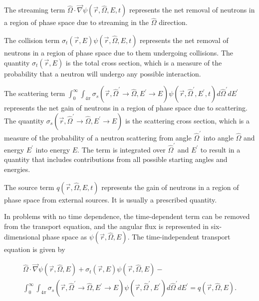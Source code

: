 The streaming term $\hat{\Omega}\cdot\vec{\nabla}\psi\left(\vec{r},\hat{\Omega},E,t\right)$
represents the net removal of neutrons in a region of phase space due to streaming in the $\hat{\Omega}$ direction.

The collision term $\sigma_t\left(\vec{r},E\right)\psi\left(\vec{r},\hat{\Omega},E,t\right)$
represents the net removal of neutrons in a region of phase space due to them undergoing collisions.
The quantity $\sigma_t\left(\vec{r},E\right)$ is the total cross section, which is a measure of the probability that a neutron will undergo any possible interaction.

The scattering term $\int_0^\infty\int_{4\pi}\sigma_s\left(\vec{r},\hat{\Omega}^\prime\rightarrow\hat{\Omega},E^\prime\rightarrow E\right)\psi\left(\vec{r},\hat{\Omega}^\prime,E^\prime,t\right)d\hat{\Omega}^\prime dE^\prime$
represents the net gain of neutrons in a region of phase space due to scattering.
The quantity $\sigma_s\left(\vec{r},\hat{\Omega}^\prime\rightarrow\hat{\Omega},E^\prime\rightarrow E\right)$ is the scattering cross section,
which is a measure of the probability of a neutron scattering from angle $\hat{\Omega}^\prime$ into angle ${\hat{\Omega}}$ and energy $E^\prime$ into energy $E$.
The term is integrated over $\hat{\Omega}^\prime$ and $E^\prime$ to result in a quantity that includes contributions from all possible starting angles and energies.

The source term $q\left(\vec{r},\hat{\Omega},E,t\right)$
represents the gain of neutrons in a region of phase space from external sources.
It is usually a prescribed quantity.

In problems with no time dependence, the time-dependent term can be removed from the transport equation,
and the angular flux is represented in six-dimensional phase space as $\psi\left(\vec{r},\hat{\Omega},E\right)$.
The time-independent transport equation is given by

\begin{multline}\label{eq:bg:rt:transport}
  \hat{\Omega}\cdot\vec{\nabla}\psi\left(\vec{r},\hat{\Omega},E\right) +
  \sigma_t\left(\vec{r},E\right)\psi\left(\vec{r},\hat{\Omega},E\right) - \\
  \int_0^\infty\int_{4\pi}\sigma_s\left(\vec{r},\hat{\Omega}^\prime\rightarrow\hat{\Omega},E^\prime\rightarrow E\right)\psi\left(\vec{r},\hat{\Omega}^\prime,E^\prime\right)d\hat{\Omega}^\prime dE^\prime =
  q\left(\vec{r},\hat{\Omega},E\right).
\end{multline}

